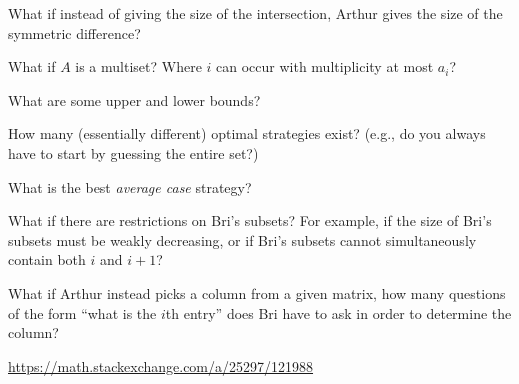 \documentclass{article}
\begin{document}
\begin{related}
  \item What if instead of giving the size of the intersection, Arthur gives the
  size of the symmetric difference?
  \item What if $A$ is a multiset?
  Where $i$ can occur with multiplicity at most $a_i$?
  \item What are some upper and lower bounds?
  \item How many (essentially different) optimal strategies exist? (e.g., do you always have to start by guessing the entire set?)
  \item What is the best \textit{average case} strategy?
  \item What if there are restrictions on Bri's subsets?
  For example, if the size of Bri's subsets must be weakly decreasing, or if
  Bri's subsets cannot simultaneously contain both $i$ and $i + 1$?
  \item What if Arthur instead picks a column from a given matrix, how many 
  questions of the form ``what is the $i$th entry'' does Bri have to ask in
  order to determine the column?
\end{related}

\begin{references}
  \item \url{https://math.stackexchange.com/a/25297/121988}
\end{references}
\end{document}
